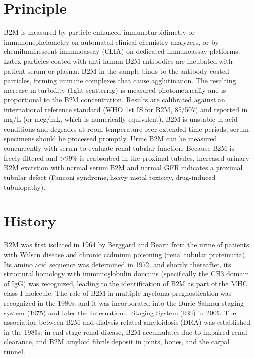 \section*{Principle}
B2M is measured by particle-enhanced immunoturbidimetry or immunonephelometry on automated clinical chemistry analyzers, or by chemiluminescent immunoassay (CLIA) on dedicated immunoassay platforms. Latex particles coated with anti-human B2M antibodies are incubated with patient serum or plasma. B2M in the sample binds to the antibody-coated particles, forming immune complexes that cause agglutination. The resulting increase in turbidity (light scattering) is measured photometrically and is proportional to the B2M concentration. Results are calibrated against an international reference standard (WHO 1st IS for B2M, 85/507) and reported in mg/L (or mcg/mL, which is numerically equivalent). B2M is unstable in acid conditions and degrades at room temperature over extended time periods; serum specimens should be processed promptly. Urine B2M can be measured concurrently with serum to evaluate renal tubular function. Because B2M is freely filtered and >99\% is reabsorbed in the proximal tubules, increased urinary B2M excretion with normal serum B2M and normal GFR indicates a proximal tubular defect (Fanconi syndrome, heavy metal toxicity, drug-induced tubulopathy).

\section*{History}
B2M was first isolated in 1964 by Berggard and Bearn from the urine of patients with Wilson disease and chronic cadmium poisoning (renal tubular proteinuria). Its amino acid sequence was determined in 1972, and shortly thereafter, its structural homology with immunoglobulin domains (specifically the CH3 domain of IgG) was recognized, leading to the identification of B2M as part of the MHC class I molecule. The role of B2M in multiple myeloma prognostication was recognized in the 1980s, and it was incorporated into the Durie-Salmon staging system (1975) and later the International Staging System (ISS) in 2005. The association between B2M and dialysis-related amyloidosis (DRA) was established in the 1980s: in end-stage renal disease, B2M accumulates due to impaired renal clearance, and B2M amyloid fibrils deposit in joints, bones, and the carpal tunnel.

